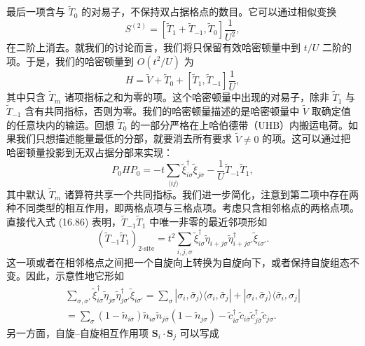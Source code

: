 最后一项含与 $\tilde{T}_{0}$ 的对易子，不保持双占据格点的数目。它可以通过相似变换
\begin{equation*}
S^{(2)}=[\tilde{T}_{1}+\tilde{T}_{-1},\tilde{T}_{0}]\frac{1}{U^{2}},\tag{16.92}
\end{equation*}
在二阶上消去。就我们的讨论而言，我们将只保留有效哈密顿量中到 $t/U$ 二阶的项。于是，我们的哈密顿量到 $O(t^{2}/U)$ 为
\begin{equation*}
H=\tilde{V}+\tilde{T}_{0}+[\tilde{T}_{1},\tilde{T}_{-1}]\frac{1}{U},\tag{16.93}
\end{equation*}
其中只含 $\tilde{T}_{m}$ 诸项指标之和为零的项。这个哈密顿量中出现的对易子，除非 $\tilde{T}_{1}$ 与 $\tilde{T}_{-1}$ 含有共同指标，否则为零。我们的哈密顿量描述的是哈密顿量中 $\tilde{V}$ 取确定值的任意块内的输运。回想 $\tilde{T}_{0}$ 的一部分严格在上哈伯德带（UHB）内搬运电荷。如果我们只想描述能量最低的分部，就要消去所有要求 $\tilde{V}\neq 0$ 的项。这可以通过把哈密顿量投影到无双占据分部来实现：
\begin{equation*}
P_{0}HP_{0}=-t\sum_{\langle ij\rangle}\tilde{\xi}^{\dagger}_{i\sigma}\tilde{\xi}_{j\sigma}-\frac{1}{U}\tilde{T}_{-1}\tilde{T}_{1},\tag{16.94}
\end{equation*}
其中默认 $\tilde{T}_{m}$ 诸算符共享一个共同指标。我们进一步简化，注意到第二项中存在两种不同类型的相互作用，即两格点项与三格点项。考虑只含相邻格点的两格点项。直接代入式 (16.86) 表明，$\tilde{T}_{-1}\tilde{T}_{1}$ 中唯一非零的最近邻项形如
\begin{equation*}
\left(\tilde{T}_{-1}\tilde{T}_{1}\right)_{2\text{-site}}=t^{2}\sum_{i,j,\sigma}\tilde{\xi}^{\dagger}_{i\sigma}\tilde{\eta}_{i+j\sigma}\tilde{\eta}^{\dagger}_{i+j\sigma'}\tilde{\xi}_{i\sigma'}.\tag{16.95}
\end{equation*}
这一项或者在相邻格点之间把一个自旋向上转换为自旋向下，或者保持自旋组态不变。因此，示意性地它形如
\begin{align*}
\sum_{\sigma,\sigma'}\tilde{\xi}^{\dagger}_{i\sigma}\tilde{\eta}_{j\sigma}\tilde{\eta}^{\dagger}_{j\sigma'}\tilde{\xi}_{i\sigma'}=\sum_{\sigma}|\sigma_{i},\bar{\sigma}_{j}\rangle\langle\sigma_{i},\bar{\sigma}_{j}|+|\sigma_{i},\bar{\sigma}_{j}\rangle\langle\bar{\sigma}_{i},\sigma_{j}|\\
=\sum_{\sigma}(1-\tilde{n}_{i\bar{\sigma}})\tilde{n}_{i\sigma}\tilde{n}_{j\bar{\sigma}}(1-\tilde{n}_{j\sigma})-\tilde{c}^{\dagger}_{i\sigma}\tilde{c}_{i\bar{\sigma}}\tilde{c}^{\dagger}_{j\bar{\sigma}}\tilde{c}_{j\sigma}.\tag{16.96}
\end{align*}
另一方面，自旋--自旋相互作用项 $\mathbf{S}_{i}\cdot\mathbf{S}_{j}$ 可以写成
